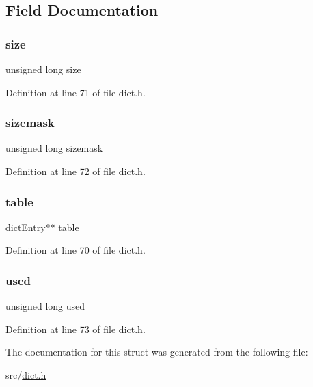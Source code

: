 \subsection{Field Documentation}
\mbox{\label{structdictht_a1e1268d164c38e4f8a4f4eb9058b0601}} 
\subsubsection{\texorpdfstring{size}{size}}
{\footnotesize\ttfamily unsigned long size}



Definition at line 71 of file dict.\+h.

\mbox{\label{structdictht_aa2d44ea57263c4ae782cbbff2a131f2b}} 
\subsubsection{\texorpdfstring{sizemask}{sizemask}}
{\footnotesize\ttfamily unsigned long sizemask}



Definition at line 72 of file dict.\+h.

\mbox{\label{structdictht_aa1d81eae7b1831354fd3e941a6c1192b}} 
\subsubsection{\texorpdfstring{table}{table}}
{\footnotesize\ttfamily \hyperlink{structdict_entry}{dict\+Entry}$\ast$$\ast$ table}



Definition at line 70 of file dict.\+h.

\mbox{\label{structdictht_abeece48b2d7c09bffa9101df617478d0}} 
\subsubsection{\texorpdfstring{used}{used}}
{\footnotesize\ttfamily unsigned long used}



Definition at line 73 of file dict.\+h.



The documentation for this struct was generated from the following file\+:\begin{DoxyCompactItemize}
\item 
src/\hyperlink{dict_8h}{dict.\+h}\end{DoxyCompactItemize}
